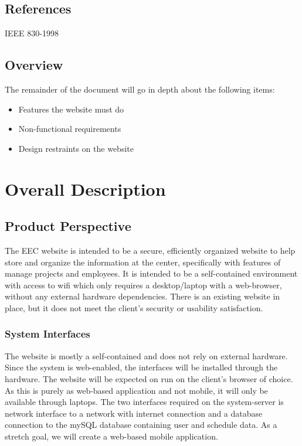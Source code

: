 \documentclass[letterpaper,10pt,titlepage,journal,compsoc,draftclsnofoot,onecolumn]{IEEEtran}
\begin{document}
\subsection{References}

IEEE 830-1998

\subsection{Overview}

The remainder of the document will go in depth about the following items:
\begin{itemize}
\item Features the website must do
\item Non-functional requirements
\item Design restraints on the website
\end{itemize}

\section{Overall Description}

\subsection{Product Perspective}

The EEC website is intended to be a secure, efficiently organized website to help store and organize the information at the center, specifically with features of manage projects and employees. It is intended to be a self-contained environment with access to wifi which only requires a desktop/laptop with a web-browser, without any external hardware dependencies. There is an existing website in place, but it does not meet the client’s security or usability satisfaction.

\subsubsection{System Interfaces}

The website is mostly a self-contained and does not rely on external hardware. Since the system is web-enabled, the interfaces will be installed through the hardware. The website will be expected on run on the client’s browser of choice. As this is purely as web-based application and not mobile, it will only be available through laptops. The two interfaces required on the system-server is network interface to a network with internet connection and a database connection to the mySQL database containing user and schedule data. As a stretch goal, we will create a web-based mobile application. 
\end{document}
